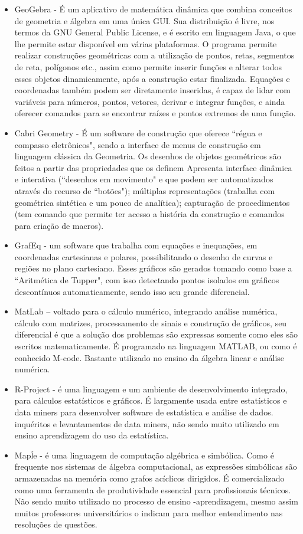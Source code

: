 \documentclass[12pt,a4paper]{article}
\begin{document}
\begin{itemize}
	\item GeoGebra - É um aplicativo de matemática dinâmica que combina conceitos de geometria e álgebra em uma única GUI. Sua distribuição é livre, nos termos da GNU General Public License, e é escrito em linguagem Java, o que lhe permite estar disponível em várias plataformas. O programa permite realizar construções geométricas com a utilização de pontos, retas, segmentos de reta, polígonos etc., assim como permite inserir funções e alterar todos esses objetos dinamicamente, após a construção estar finalizada. Equações e coordenadas também podem ser diretamente inseridas, é capaz de lidar com variáveis para números, pontos, vetores, derivar e integrar funções, e ainda oferecer comandos para se encontrar raízes e pontos extremos de uma função.
	\item Cabri Geometry - É um software de construção que oferece ``régua e compasso eletrônicos", sendo a interface de menus de construção em linguagem clássica da Geometria. Os desenhos de objetos geométricos são feitos a partir das propriedades que os definem Apresenta interface dinâmica e interativa (``desenhos em movimento" e que podem ser automatizados através do recurso de ``botões"); múltiplas representações (trabalha com geométrica sintética e um pouco de analítica); capturação de procedimentos (tem comando que permite ter acesso a história da construção e comandos para criação de macros).
	\item GrafEq - um software que trabalha com equações e inequações, em coordenadas cartesianas e polares, possibilitando o desenho de curvas e regiões no plano cartesiano. Esses gráficos são gerados tomando como base a ``Aritmética de Tupper", com isso detectando pontos isolados em gráficos descontínuos automaticamente, sendo isso seu grande diferencial.
	\item MatLab – voltado para o cálculo numérico, integrando análise numérica, cálculo com matrizes, processamento de sinais e construção de gráficos, seu diferencial é que a solução dos problemas são expressas somente como eles são escritos matematicamente. É programado na linguagem MATLAB, ou como é conhecido M-code. Bastante utilizado no ensino da álgebra linear e análise numérica.
	\item R-Project - é uma linguagem e um ambiente de desenvolvimento integrado, para cálculos estatísticos e gráficos. É largamente usada entre estatísticos e data miners para desenvolver software de estatística e análise de dados. inquéritos e levantamentos de data miners, não sendo muito utilizado em ensino aprendizagem do uso da estatística.
	\item Mapĺe - é uma linguagem de computação algébrica e simbólica. Como é frequente nos sistemas de álgebra computacional, as expressões simbólicas são armazenadas na memória como grafos acíclicos dirigidos. É comercializado como uma ferramenta de produtividade essencial para profissionais técnicos. Não sendo muito utilizado no processo de ensino -aprendizagem, mesmo assim muitos professores universitários o indicam para melhor entendimento nas resoluções de questões.
\end{itemize}
\end{document}
